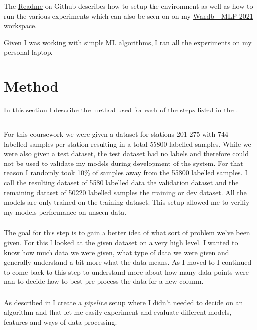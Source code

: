 \documentclass[a4paper]{article}
\begin{document}
    The \href{https://github.com/isabelladegen/mlp-2021}{Readme} on Github describes how to setup the environment as well
    as how to run the various experiments which can also be seen on on my \href{https://wandb.ai/idegen/mlp-2021}{Wandb - MLP 2021 workspace}.

    Given I was working with simple ML algorithms, I ran all the experiments on my personal laptop.


    \section{Method}\label{sec:method}

    In this section I describe the method used for each of the steps listed in the .

    \subsection*{}

    For this coursework we were given a dataset for stations 201-275 with 744 labelled samples per station
    resulting in a total 55800 labelled samples. While we were also given a test dataset, the test dataset had no labels
    and therefore could not be used to validate my models during development of the system. For that reason I randomly
    took 10\% of samples away from the 55800 labelled samples. I call the resulting dataset of 5580 labelled data the validation
    dataset and the remaining dataset of 50220 labelled samples the training or dev dataset. All the models are only
    trained on the training dataset. This setup allowed me to verifiy my models performance on unseen data.

    \subsubsection*{}
    The goal for this step is to gain a better idea of what sort of problem we've been given. For this I looked at the
    given dataset on a very high level. I wanted to know how much data we were given, what type of data we were given and
    generally understand
    a bit more what the data means. As I moved to  I continued to come back to this step
    to understand more about how many data points were nan to decide how to best pre-process the data for a new column.


    \subsubsection*{}
    As described in  I create a \textit{pipeline} setup where I didn't needed to decide
    on an algorithm and that let me easily experiment and evaluate different models, features and ways of data processing.
\end{document}
